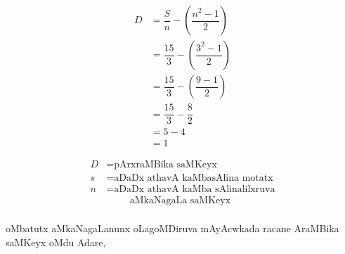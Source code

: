 \begin{minipage}[l]{3cm}
\begin{align*}
D &= \dfrac{S}{n}-\left(\dfrac{n^2-1}{2} \right)\\
& =\dfrac{15}{3}- \left(\dfrac{3^2-1}{2} \right)\\
& =\dfrac{15}{3}-\left(\dfrac{9-1}{2} \right)\\
& =\dfrac{15}{3}-\dfrac{8}{2}\\
& =5-4\\
&=1
\end{align*}
\end{minipage}
\begin{minipage}[c]{4cm}
\begin{align*}
D & = \text{pArxraMBika saMKeyx}\\
s & = \text{aDaDx athavA kaMbasAlina motatx}\\
n & = \text{aDaDx athavA kaMba sAlinalilxruva}\\
& \hspace{1cm} \text{aMkaNagaLa saMKeyx}\\[30pt]
\end{align*}
\end{minipage}

 oMbatutx aMkaNagaLanunx oLagoMDiruva mAyAcwkada racane AraMBika saMKeyx oMdu Adare,

